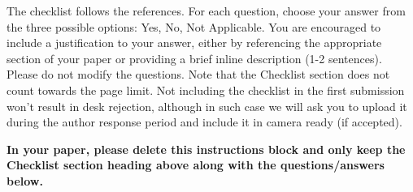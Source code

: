 \documentclass[twoside]{article}
\theoremstyle{definition}
\newcommand{\1}[1]{\scalebox{1.25}{$\mathds{1}$}\left[#1\right]}
\begin{document}
The checklist follows the references. For each question, choose your answer from the three possible options: Yes, No, Not Applicable.  You are encouraged to include a justification to your answer, either by referencing the appropriate section of your paper or providing a brief inline description (1-2 sentences). 
Please do not modify the questions.  Note that the Checklist section does not count towards the page limit. Not including the checklist in the first submission won't result in desk rejection, although in such case we will ask you to upload it during the author response period and include it in camera ready (if accepted).

\textbf{In your paper, please delete this instructions block and only keep the Checklist section heading above along with the questions/answers below.}
\end{document}
